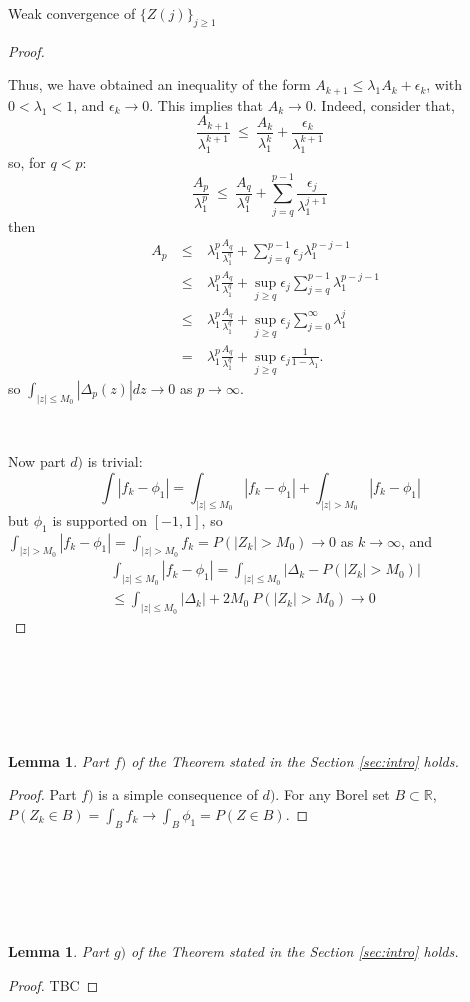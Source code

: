 \documentclass[12pt]{article}
\newtheorem{lemma}[theorem]{Lemma}
\begin{document}
\begin{section}{Weak convergence of $\{Z(j)\}_{j \ge 1}$ }
\begin{proof}
\  

Thus, we have obtained an inequality of the form $A_{k+1} \le \lambda_1 A_k + \epsilon_k $, with $0 < \lambda_1 < 1$, and $\epsilon_k \rightarrow 0$. This implies that $A_k \rightarrow 0$. Indeed, consider that,
$$
\frac{A_{k+1}}{\lambda_1^{k+1}} ~\le~ \frac{A_{k}}{\lambda_1^{k}} + \frac{\epsilon_{k}}{\lambda_1^{k+1}}
$$
so, for $q < p$:
$$
\frac{A_p}{\lambda_1^p} ~\le~ \frac{A_q}{\lambda_1^q} + \sum_{j=q}^{p-1} \frac{\epsilon_{j}}{\lambda_1^{j+1}}
$$
then
$$
\begin{aligned}
& A_p &~\le~& \lambda_1^p \frac{A_q}{\lambda_1^q} + \sum_{j=q}^{p-1} \epsilon_j \lambda_1^{p-j-1} \\
&\  &~\le~& \lambda_1^p \frac{A_q}{\lambda_1^q} 
+ \sup_{j \ge q} \epsilon_j  \sum_{j=q}^{p-1} \lambda_1^{p-j-1} \\
&\  &~\le& \lambda_1^p \frac{A_q}{\lambda_1^q} 
+ \sup_{j \ge q} \epsilon_j  \sum_{j=0}^{\infty} \lambda_1^{j} \\
&\  &~=~& \lambda_1^p \frac{A_q}{\lambda_1^q} 
+ \sup_{j \ge q} \epsilon_j  \frac{1}{1-\lambda_1}.
\end{aligned}
$$
so $ \int_{|z| \le M_0} |\Delta_p(z)| dz \rightarrow 0$ as $p \rightarrow \infty$.  

\ 

Now part $d)$ is trivial:
$$
\int |f_k - \phi_1| = \int_{|z| \le M_0} |f_k - \phi_1|  + \int_{|z| > M_0}  |f_k - \phi_1|
$$
but $\phi_1$ is supported on $[-1,1]$, so $\int_{|z| > M_0}  |f_k - \phi_1| = \int_{|z| > M_0}  f_k = P(|Z_k| > M_0) \rightarrow 0$ as $k \rightarrow \infty$,
and
\begin{align*}
&\int_{|z| \le M_0} |f_k - \phi_1| = \int_{|z| \le M_0} |\Delta_k - P(|Z_k| > M_0)| \\
&\le \int_{|z| \le M_0} |\Delta_k|  + 2M_0\ P(|Z_k| > M_0) \rightarrow 0
\end{align*}
\end{proof}

\  

\  

\  

\begin{lemma}
	Part $f)$ of the Theorem stated in the Section \ref{sec:intro} holds.
\end{lemma}
\begin{proof}
Part $f)$ is a simple consequence of $d)$. For any Borel set $B \subset \mathbb{R}$, $P(Z_k \in B) = \int_B f_k \rightarrow  \int_B \phi_1 = P(Z \in B)$. 
\end{proof}


\  

\  

\  

\begin{lemma}
	Part $g)$ of the Theorem stated in the Section \ref{sec:intro} holds.
\end{lemma}
\begin{proof}
TBC
\end{proof}




\end{section}
\end{document}
